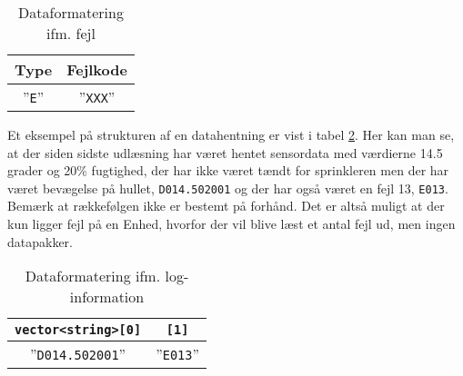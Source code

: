 \begin{table}[h]
	\caption{Dataformatering ifm. fejl}
	\centering
	\begin{tabular}{|c|c|}
		\hline 
		\textbf{Type} & \textbf{Fejlkode} \\ 
		\hline 
		''\verb+E+'' & ''\verb+XXX+'' \\ 
		\hline 
	\end{tabular} 
	\label{table:SWDataprotokol-error}
\end{table}

Et eksempel på strukturen af en datahentning er vist i tabel \ref{table:SWDataprotokol-eksempel}. Her kan man se, at der siden sidste udlæsning har været hentet sensordata med værdierne 14.5 grader og 20\% fugtighed, der har ikke været tændt for sprinkleren men der har været bevægelse på hullet, \verb+D014.502001+ og der har også været en fejl 13, \verb+E013+. Bemærk at rækkefølgen ikke er bestemt på forhånd. Det er altså muligt at der kun ligger fejl på en Enhed, hvorfor der vil blive læst et antal fejl ud, men ingen datapakker.

\begin{table}[h]
	\caption{Dataformatering ifm. log-information}
	\centering
	\begin{tabular}{|c|c|}
		\hline
		\verb+vector<string>[0]+ & \verb+[1]+ \\
		\hline 
		''\verb+D014.502001+'' & ''\verb+E013+'' \\ 
		\hline 
	\end{tabular} 
	\label{table:SWDataprotokol-eksempel}
\end{table}